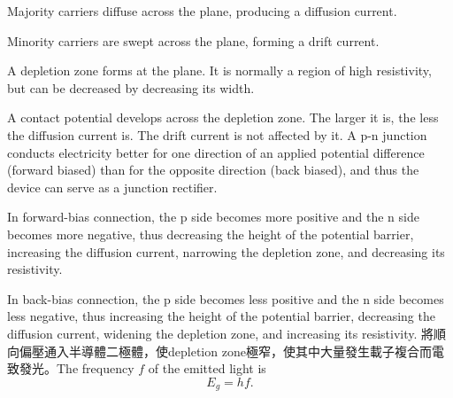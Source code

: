 \documentclass[a4paper,12pt]{article}
\begin{document}
\bit
\item Majority carriers diffuse across the plane, producing a diffusion current.
\item Minority carriers are swept across the plane, forming a drift current.
\item A depletion zone forms at the plane. It is normally a region of high resistivity, but can be decreased by decreasing its width.
\item A contact potential develops across the depletion zone. The larger it is, the less the diffusion current is. The drift current is not affected by it.
\eit
{}
A p-n junction conducts electricity better for one direction of an applied potential difference (forward biased) than for the opposite direction (back biased), and thus the device can serve as a junction rectifier.

In forward-bias connection, the p side becomes more positive and the n side becomes more negative, thus decreasing the height of the potential barrier, increasing the diffusion current, narrowing the depletion zone, and decreasing its resistivity.

In back-bias connection, the p side becomes less positive and the n side becomes less negative, thus increasing the height of the potential barrier, decreasing the diffusion current, widening the depletion zone, and increasing its resistivity.
將順向偏壓通入半導體二極體，使depletion zone極窄，使其中大量發生載子複合而電致發光。The frequency $f$ of the emitted light is
\[E_g=hf.\]
\end{document}

